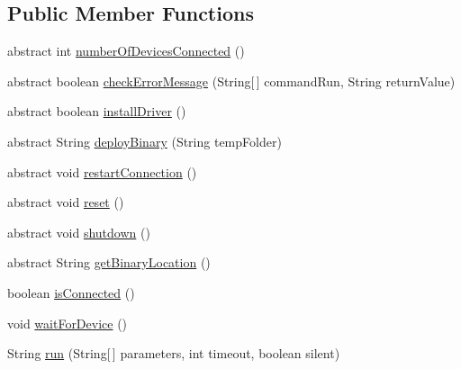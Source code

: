 \subsection*{Public Member Functions}
\begin{DoxyCompactItemize}
\item 
abstract int \hyperlink{class_c_a_s_u_a_l_1_1communicationstools_1_1_abstract_device_communications_protocol_a7133a942941bd206da3944667e154240}{number\-Of\-Devices\-Connected} ()
\item 
abstract boolean \hyperlink{class_c_a_s_u_a_l_1_1communicationstools_1_1_abstract_device_communications_protocol_ac31f16b05cb310dcbde9651d7a31c4e0}{check\-Error\-Message} (String\mbox{[}$\,$\mbox{]} command\-Run, String return\-Value)
\item 
abstract boolean \hyperlink{class_c_a_s_u_a_l_1_1communicationstools_1_1_abstract_device_communications_protocol_aceee4460b32e7378f74a41ce45c2ccef}{install\-Driver} ()
\item 
abstract String \hyperlink{class_c_a_s_u_a_l_1_1communicationstools_1_1_abstract_device_communications_protocol_ae43d1daab84383c3d7a544f6fb8bcf17}{deploy\-Binary} (String temp\-Folder)
\item 
abstract void \hyperlink{class_c_a_s_u_a_l_1_1communicationstools_1_1_abstract_device_communications_protocol_a997c2d99e76612350b8367e0a8919dbc}{restart\-Connection} ()
\item 
abstract void \hyperlink{class_c_a_s_u_a_l_1_1communicationstools_1_1_abstract_device_communications_protocol_a19717483b350ae780ef8ca86a1760ad9}{reset} ()
\item 
abstract void \hyperlink{class_c_a_s_u_a_l_1_1communicationstools_1_1_abstract_device_communications_protocol_a761816f9cf6221eceae2629b2252a930}{shutdown} ()
\item 
abstract String \hyperlink{class_c_a_s_u_a_l_1_1communicationstools_1_1_abstract_device_communications_protocol_ae90f2b1d24002a9956343e81371e352f}{get\-Binary\-Location} ()
\item 
boolean \hyperlink{class_c_a_s_u_a_l_1_1communicationstools_1_1_abstract_device_communications_protocol_acb35a91acf67507d2c43e91d2ccbeb04}{is\-Connected} ()
\item 
void \hyperlink{class_c_a_s_u_a_l_1_1communicationstools_1_1_abstract_device_communications_protocol_aa1b32f413602be32994c7631e1882c01}{wait\-For\-Device} ()
\item 
String \hyperlink{class_c_a_s_u_a_l_1_1communicationstools_1_1_abstract_device_communications_protocol_a2f61734750ded9056774a6ae82334a40}{run} (String\mbox{[}$\,$\mbox{]} parameters, int timeout, boolean silent)

\end{DoxyCompactItemize}
